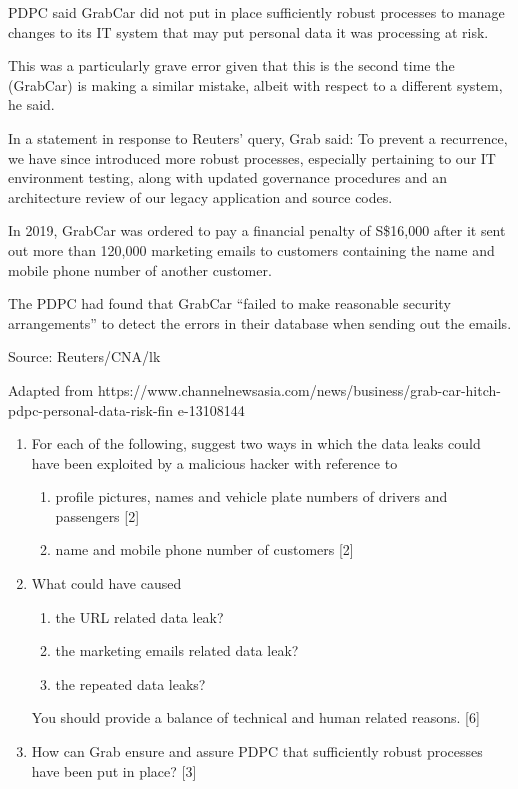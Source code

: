 PDPC said GrabCar did not put in place \textquotedbl sufficiently
robust processes\textquotedbl{} to manage changes to its IT system
that may put personal data it was processing at risk. 

\textquotedbl This was a particularly grave error given that this
is the second time the (GrabCar) is making a similar mistake, albeit
with respect to a different system,\textquotedbl{} he said.

In a statement in response to Reuters' query, Grab said: \textquotedbl To
prevent a recurrence, we have since introduced more robust processes,
especially pertaining to our IT environment testing, along with updated
governance procedures and an architecture review of our legacy application
and source codes.\textquotedbl{} 

In 2019, GrabCar was ordered to pay a financial penalty of S\$16,000
after it sent out more than 120,000 marketing emails to customers
containing the name and mobile phone number of another customer. 

The PDPC had found that GrabCar \textquotedblleft failed to make reasonable
security arrangements\textquotedblright{} to detect the errors in
their database when sending out the emails. 

Source: Reuters/CNA/lk 

Adapted from https://www.channelnewsasia.com/news/business/grab-car-hitch-pdpc-personal-data-risk-fin
e-13108144 
\begin{enumerate}
\item For each of the following, suggest two ways in which the data leaks
could have been exploited by a malicious hacker with reference to 
\begin{enumerate}
\item profile pictures, names and vehicle plate numbers of drivers and passengers\hfill{}
{[}2{]}
\item name and mobile phone number of customers \hfill{}{[}2{]}
\end{enumerate}
\item What could have caused 
\begin{enumerate}
\item the URL related data leak? 
\item the marketing emails related data leak? 
\item the repeated data leaks? 
\end{enumerate}
You should provide a balance of technical and human related reasons.
\hfill{}{[}6{]}
\item How can Grab ensure and assure PDPC that sufficiently robust processes
have been put in place? \hfill{}{[}3{]}
\end{enumerate}
